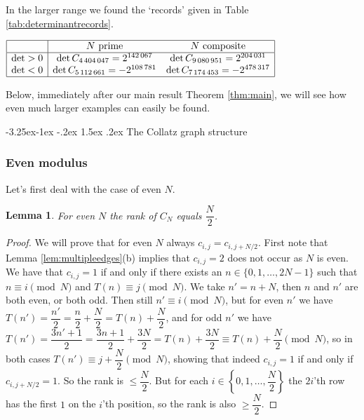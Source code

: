 \documentclass[10pt]{article}
\makeatletter
\renewcommand\subsection{\@startsection{subsection}{2}{\z@}
{-3.25ex\@plus -1ex \@minus -.2ex}
{1.5ex \@plus .2ex}
{\normalfont\normalsize\bfseries\boldmath}}
\newtheorem{lemma}{Lemma}
\theoremstyle{definition}
\makeatother
\begin{document}
In the larger range we found the `records' given in Table \ref{tab:determinantrecords}.

\begin{table}[ht]
    \centering
    {\footnotesize $ \begin{array}{|c|cc|} \hline
            & N \text{ prime} & N \text{ composite} \\ \hline
            \det > 0 & \det C_{4\,404\,047} = 2^{142\,067} & \det C_{9\,080\,951} = 2^{204\,031} \\
            \det < 0 & \det C_{5\,112\,661} = -2^{108\,781} & \det C_{7\,174\,453} = -2^{478\,317} \\ \hline
        \end{array} $}
    \caption{Record determinants for $ N $ below $ 10,000,000 $.}
    \label{tab:determinantrecords}
\end{table}

Below, immediately after our main result Theorem \ref{thm:main}, we will see how even much larger
examples can easily be found.

\subsection{The Collatz graph structure}
\subsubsection{Even modulus}

Let's first deal with the case of even $ N $.

\begin{lemma} \label{lem:rank}
    For even $ N $ the rank of $ C_N $ equals $ \dfrac{N}{2} $.
\end{lemma}

\begin{proof}
    We will prove that for even $ N $ always $ c_{i,j} = c_{i,j+N/2} $. First note that Lemma
    \ref{lem:multipleedges}(b) implies that $ c_{i,j} = 2 $ does not occur as $ N $ is even. We have that
    $ c_{i,j} = 1 $ if and only if there exists an $ n \in \{ 0, 1, \ldots, 2N-1 \} $ such that
    $ n \equiv i \pmod{N} $ and $ T(n) \equiv j \pmod{N} $. We take $ n' = n + N $, then $ n $ and $ n' $ are
    both even, or both odd. Then still $ n' \equiv i \pmod{N} $, but for even $ n' $ we have
    $ T(n') = \dfrac{n'}{2} = \dfrac{n}{2} + \dfrac{N}{2} = T(n) + \dfrac{N}{2} $, and for odd $ n' $ we have
    $ T(n') = \dfrac{3n'+1}{2} = \dfrac{3n+1}{2} + \dfrac{3N}{2} = T(n) + \dfrac{3N}{2} \equiv T(n) +
    \dfrac{N}{2} \pmod{N} $, so in both cases $ T(n') \equiv j + \dfrac{N}{2} \pmod{N} $, showing that indeed
    $ c_{i,j} = 1 $ if and only if $ c_{i,j+N/2} = 1 $. So the rank is $ \leq \dfrac{N}{2} $. But for each
    $ i \in \left\{ 0, 1, \ldots, \dfrac{N}{2} \right\} $ the $ 2i $'th row has the first $ 1 $ on the
    $ i $'th position, so the rank is also $ \geq \dfrac{N}{2} $.
\end{proof}
\end{document}
